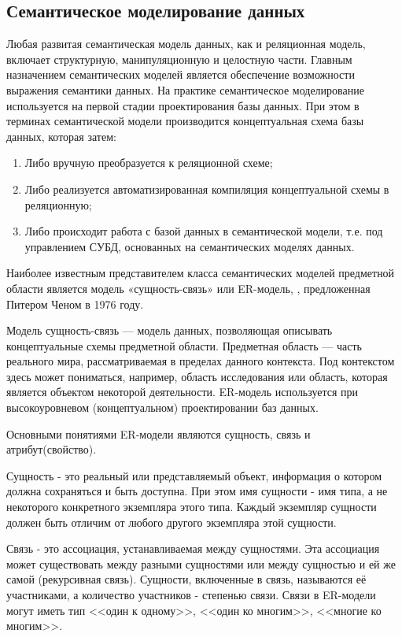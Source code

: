 \subsection{Семантическое моделирование данных}

Любая развитая семантическая модель данных, как и реляционная модель, включает структурную, манипуляционную и целостную части. Главным назначением семантических моделей является обеспечение возможности выражения семантики данных. На практике семантическое моделирование используется на первой стадии проектирования базы данных. При этом в терминах семантической модели производится концептуальная схема базы данных, которая затем:
\begin{enumerate}
	\item Либо вручную преобразуется к реляционной схеме;
	\item Либо реализуется автоматизированная компиляция концептуальной схемы в реляционную;
	\item Либо происходит работа с базой данных в семантической модели, т.е. под управлением СУБД, основанных на семантических моделях данных. 
\end{enumerate}

Наиболее известным представителем класса семантических моделей предметной области является модель «сущность-связь» или ER-модель, , предложенная Питером Ченом в 1976 году.

Модель сущность-связь — модель данных, позволяющая описывать концептуальные схемы предметной области. Предметная область — часть реального мира, рассматриваемая в пределах данного контекста. Под контекстом здесь может пониматься, например, область исследования или область, которая является объектом некоторой деятельности. ER-модель используется при высокоуровневом (концептуальном) проектировании баз данных.

Основными понятиями ER-модели являются сущность, связь и атрибут(свойство).

Сущность - это реальный или представляемый объект, информация о котором должна сохраняться и быть доступна. При этом имя сущности - имя типа, а не некоторого конкретного экземпляра этого типа. Каждый экземпляр сущности должен быть отличим от любого другого экземпляра этой сущности.

Связь - это ассоциация, устанавливаемая между сущностями. Эта ассоциация может существовать между разными сущностями или между сущностью и ей же самой (рекурсивная связь). Сущности, включенные в связь, называются её участниками, а количество участников - степенью связи. Связи в ER-модели могут иметь тип <<один к одному>>, <<один ко многим>>, <<многие ко многим>>.

